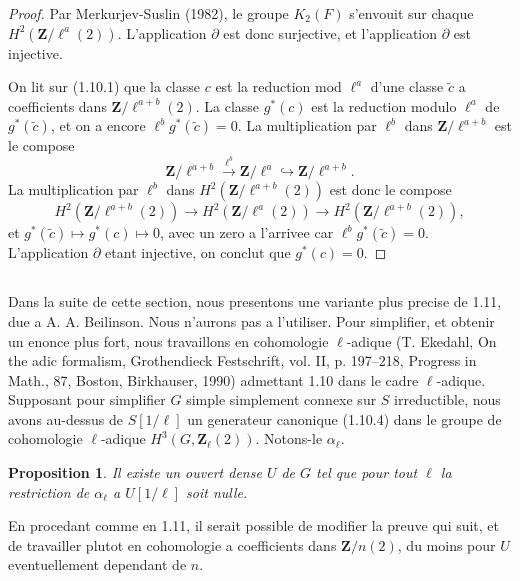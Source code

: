 \documentclass[11pt,a4paper]{article}
\theoremstyle{plain}
\newtheorem{proposition}[theorem]{Proposition}
\theoremstyle{definition}
\begin{document}
\begin{proof}
Par Merkurjev-Suslin (1982), le groupe $K_2(F)$ s'envouit sur chaque $H^2(\mathbf{Z}/\ell^a(2))$. L'application $\partial$ est donc surjective, et l'application $\partial$ est injective.

On lit sur (1.10.1) que la classe $c$ est la reduction mod $\ell^a$ d'une classe $\tilde{c}$ a coefficients dans $\mathbf{Z}/\ell^{a+b}(2)$. La classe $g^*(c)$ est la reduction modulo $\ell^a$ de $g^*(\tilde{c})$, et on a encore $\ell^b g^*(\tilde{c}) = 0$. La multiplication par $\ell^b$ dans $\mathbf{Z}/\ell^{a+b}$ est le compose
\[
\mathbf{Z}/\ell^{a+b} \xrightarrow{\ell^b} \mathbf{Z}/\ell^a \hookrightarrow \mathbf{Z}/\ell^{a+b}.
\]
La multiplication par $\ell^b$ dans $H^2(\mathbf{Z}/\ell^{a+b}(2))$ est donc le compose
\[
H^2(\mathbf{Z}/\ell^{a+b}(2)) \to H^2(\mathbf{Z}/\ell^a(2)) \to H^2(\mathbf{Z}/\ell^{a+b}(2)),
\]
et $g^*(\tilde{c}) \mapsto g^*(c) \mapsto 0$,
avec un zero a l'arrivee car $\ell^b g^*(\tilde{c}) = 0$. L'application $\partial$ etant injective, on conclut que $g^*(c) = 0$.
\end{proof}

\subsection{}\label{1.12}

Dans la suite de cette section, nous presentons une variante plus precise de 1.11, due a A. A. Beilinson. Nous n'aurons pas a l'utiliser. Pour simplifier, et obtenir un enonce plus fort, nous travaillons en cohomologie $\ell$-adique (T. Ekedahl, On the adic formalism, Grothendieck Festschrift, vol. II, p. 197--218, Progress in Math., 87, Boston, Birkhauser, 1990) admettant 1.10 dans le cadre $\ell$-adique. Supposant pour simplifier $G$ simple simplement connexe sur $S$ irreductible, nous avons au-dessus de $S[1/\ell]$ un generateur canonique (1.10.4) dans le groupe de cohomologie $\ell$-adique $H^3(G, \mathbf{Z}_\ell(2))$. Notons-le $\alpha_\ell$.

\begin{proposition}\label{1.13}
Il existe un ouvert dense $U$ de $G$ tel que pour tout $\ell$ la restriction de $\alpha_\ell$ a $U[1/\ell]$ soit nulle.
\end{proposition}

En procedant comme en 1.11, il serait possible de modifier la preuve qui suit, et de travailler plutot en cohomologie a coefficients dans $\mathbf{Z}/n(2)$, du moins pour $U$ eventuellement dependant de $n$.
\end{document}
